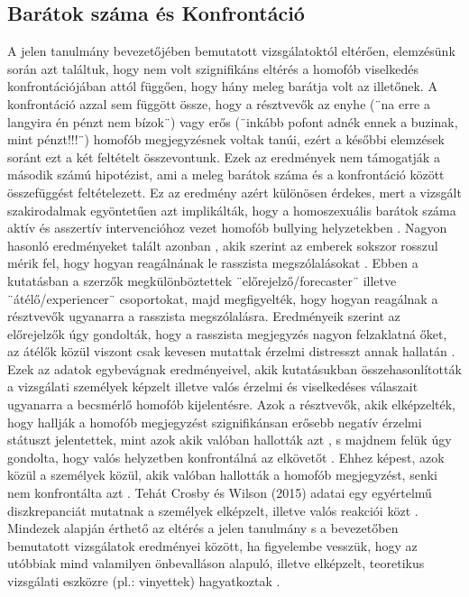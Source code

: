 \subsection{Barátok száma és Konfrontáció}
A jelen tanulmány bevezetőjében bemutatott vizsgálatoktól \parencite{poteat_vecho_2016} elté\-rően, elemzésünk során azt találtuk, hogy nem volt szignifikáns eltérés a homofób viselkedés konfrontációjában attól függően, hogy hány meleg barátja volt az illetőnek. A konfrontáció azzal sem függött össze, hogy a résztvevők az enyhe (¨na erre a langyira én pénzt nem bízok¨) vagy erős (¨inkább pofont adnék ennek a buzinak, mint pénzt!!!¨) homofób megjegyzésnek voltak tanúi, ezért a későbbi elemzések soránt ezt a két feltételt összevontunk. Ezek az eredmények nem támogatják a második számú hipotézist, ami a meleg barátok száma és a konfrontáció között összefüggést feltételezett. Ez az eredmény azért különösen érdekes, mert a vizsgált szakirodalmak egyöntetűen azt implikálták, hogy a homoszexuális barátok száma aktív és asszertív intervencióhoz vezet homofób bullying helyzetekben \parencite{poteat_vecho_2016}. Nagyon hasonló eredményeket talált azonban \textcite{kawakami_dunn_karmali_dovidio_2009}, akik szerint az emberek sokszor rosszul mérik fel, hogy hogyan reagálnának le rasszista megszólalásokat \parencite{kawakami_dunn_karmali_dovidio_2009}. Ebben a kutatásban a szerzők megkülönböztettek ¨előrejelző/forecaster¨ illetve ¨átélő/experiencer¨ csoportokat, majd megfigyelték, hogy hogyan reagálnak a résztvevők ugyanarra a rasszista megszólalásra. Eredményeik szerint az előrejelzők úgy gondolták, hogy a rasszista megjegyzés nagyon felzaklatná őket, az átélők közül viszont csak kevesen mutattak érzelmi distresszt annak hallatán \parencite{kawakami_dunn_karmali_dovidio_2009}. Ezek az adatok egybevágnak \textcite{crosby_wilson_2015} eredményeivel, akik kutatásukban összehasonlították a vizsgálati személyek képzelt illetve valós érzelmi és viselkedéses válaszait ugyanarra a becsmérlő homofób kijelentésre. Azok a résztvevők, akik elképzelték, hogy hallják a homofób megjegyzést szignifikánsan erősebb negatív érzelmi státuszt jelentettek, mint azok akik valóban hallották azt \parencite{crosby_wilson_2015}, s majdnem felük úgy gondolta, hogy valós helyzetben konfrontálná az elkövetőt \parencite{crosby_wilson_2015}. Ehhez képest, azok közül a személyek közül, akik valóban hallották a homofób megjegyzést, senki nem konfrontálta azt \parencite{crosby_wilson_2015}. Tehát Crosby és Wilson (2015) adatai egy egyértelmű diszkrepanciát mutatnak a személyek elképzelt, illetve valós reakciói közt \parencite{crosby_wilson_2015}. 
Mindezek alapján érthető az eltérés a jelen tanulmány s a bevezetőben bemutatott vizsgálatok eredményei között, ha figyelembe vesszük, hogy az utóbbiak mind valamilyen önbevalláson alapuló, illetve elképzelt, teoretikus vizsgálati eszközre (pl.: vinyettek) hagyatkoztak \parencite{poteat_vecho_2016, antonio_guerra_moleiro_2017,dasgupta_rivera_2008}.

